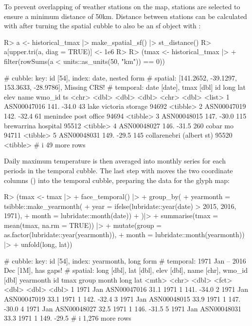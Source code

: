 \documentclass[
  shortnames]{jss}
\begin{document}
To prevent overlapping of weather stations on the map, stations are selected to ensure a minimum distance of 50km. Distance between stations can be calculated with  after turning the spatial cubble to also be an sf object with :

\begin{CodeChunk}
\begin{CodeInput}
R> a <- historical_tmax |> make_spatial_sf() |> st_distance()
R> a[upper.tri(a, diag = TRUE)] <- 1e6
R> 
R> (tmax <- historical_tmax |> 
+   filter(rowSums(a < units::as_units(50, "km")) == 0))
\end{CodeInput}
\begin{CodeOutput}
# cubble:   key: id [54], index: date, nested form
# spatial:  [141.2652, -39.1297, 153.3633, -28.9786], Missing CRS!
# temporal: date [date], tmax [dbl]
  id           long   lat  elev name                     wmo_id ts      
  <chr>       <dbl> <dbl> <dbl> <chr>                     <dbl> <list>  
1 ASN00047016  141. -34.0    43 lake victoria storage     94692 <tibble>
2 ASN00047019  142. -32.4    61 menindee post office      94694 <tibble>
3 ASN00048015  147. -30.0   115 brewarrina hospital       95512 <tibble>
4 ASN00048027  146. -31.5   260 cobar mo                  94711 <tibble>
5 ASN00048031  149. -29.5   145 collarenebri (albert st)  95520 <tibble>
# i 49 more rows
\end{CodeOutput}
\end{CodeChunk}

Daily maximum temperature is then averaged into monthly series for each periods in the temporal cubble. The last step with  moves the two coordinate columns () into the temporal cubble, preparing the data for the glyph map:

\begin{CodeChunk}
\begin{CodeInput}
R> (tmax <- tmax |>
+   face_temporal() |> 
+   group_by(
+     yearmonth = tsibble::make_yearmonth(
+       year = ifelse(lubridate::year(date) > 2015, 2016, 1971),
+       month = lubridate::month(date))
+   )|>
+   summarise(tmax = mean(tmax, na.rm = TRUE)) |> 
+   mutate(group = as.factor(lubridate::year(yearmonth)),
+          month = lubridate::month(yearmonth)) |> 
+   unfold(long, lat))
\end{CodeInput}
\begin{CodeOutput}
# cubble:   key: id [54], index: yearmonth, long form
# temporal: 1971 Jan -- 2016 Dec [1M], has gaps!
# spatial:  long [dbl], lat [dbl], elev [dbl], name [chr], wmo_id [dbl]
  yearmonth id           tmax group month  long   lat
      <mth> <chr>       <dbl> <fct> <dbl> <dbl> <dbl>
1  1971 Jan ASN00047016  31.1 1971      1  141. -34.0
2  1971 Jan ASN00047019  33.1 1971      1  142. -32.4
3  1971 Jan ASN00048015  33.9 1971      1  147. -30.0
4  1971 Jan ASN00048027  32.5 1971      1  146. -31.5
5  1971 Jan ASN00048031  33.3 1971      1  149. -29.5
# i 1,276 more rows
\end{CodeOutput}
\end{CodeChunk}
\end{document}
